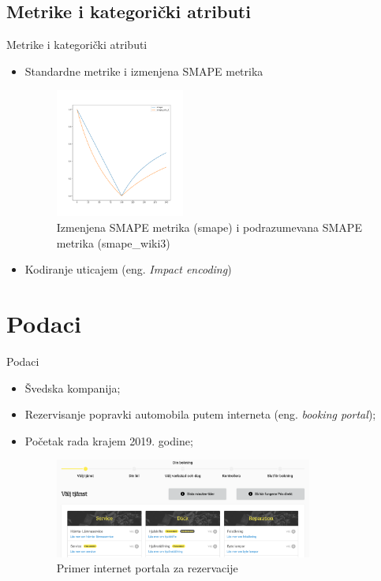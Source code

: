 \documentclass{beamer}
\begin{document}
\subsection{Metrike i kategorički atributi}
\begin{frame}{Metrike i kategorički atributi}
\begin{itemize}
    \item Standardne metrike i izmenjena SMAPE metrika 
    \begin{figure}
        \centering
        \includegraphics[width=0.4\textwidth]{images/smape_test.png}
        \vspace{-10px}
        \caption{Izmenjena SMAPE metrika (smape) i podrazumevana SMAPE metrika (smape\_wiki3)}
        \label{fig:smape_test}
    \end{figure}
    \vspace{-10px}
    \item Kodiranje uticajem (eng. \textit{Impact encoding})   
\end{itemize}
\end{frame}

\section{Podaci}
\begin{frame}{Podaci}
\begin{itemize}
    \item Švedska kompanija;
    \item Rezervisanje popravki automobila putem interneta (eng. \textit{booking portal});
    \item Početak rada krajem 2019. godine;
    \vspace{5px}
    \begin{figure}
        \centering
        \includegraphics[width=0.8\textwidth]{images/swedish_company.png}
        \caption{Primer internet portala za rezervacije}
        \label{fig:booking_portal}
    \end{figure}
\end{itemize}
\end{frame}
\end{document}

